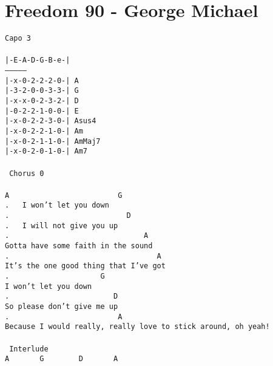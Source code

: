 \newpage
\section{Freedom 90 - George Michael}
\label{Freedom 90 - George Michael}
\texttt{Capo 3\\
\\
|-E-A-D-G-B-e-|\\
---------------\\
|-x-0-2-2-2-0-|\ A\\
|-3-2-0-0-3-3-|\ G\\
|-x-x-0-2-3-2-|\ D\\
|-0-2-2-1-0-0-|\ E\\
|-x-0-2-2-3-0-|\ Asus4\\
|-x-0-2-2-1-0-|\ Am\\
|-x-0-2-1-1-0-|\ AmMaj7\\
|-x-0-2-0-1-0-|\ Am7\\
\\
\lbrack\ Chorus\ 0\rbrack\\
\\
A\ \ \ \ \ \ \ \ \ \ \ \ \ \ \ \ \ \ \ \ \ \ \ \ \ G\\
. \ \ I\ won't\ let\ you\ down\\
. \ \ \ \ \ \ \ \ \ \ \ \ \ \ \ \ \ \ \ \ \ \ \ \ \ \ D\\
. \ \ I\ will\ not\ give\ you\ up\\
. \ \ \ \ \ \ \ \ \ \ \ \ \ \ \ \ \ \ \ \ \ \ \ \ \ \ \ \ \ \ A\\
Gotta\ have\ some\ faith\ in\ the\ sound\\
. \ \ \ \ \ \ \ \ \ \ \ \ \ \ \ \ \ \ \ \ \ \ \ \ \ \ \ \ \ \ \ \ \ A\ \ \\
It's\ the\ one\ good\ thing\ that\ I've\ got\\
. \ \ \ \ \ \ \ \ \ \ \ \ \ \ \ \ \ \ \ \ G\ \\
I\ won't\ let\ you\ down\\
. \ \ \ \ \ \ \ \ \ \ \ \ \ \ \ \ \ \ \ \ \ \ \ D\\
So\ please\ don't\ give\ me\ up\\
. \ \ \ \ \ \ \ \ \ \ \ \ \ \ \ \ \ \ \ \ \ \ \ \ A\ \ \ \ \ \ \ \ \ \ \ \ \ \ \ \ \ \ \ \ \ \ \ \ \ \ \ \ \ \\
Because\ I\ would\ really,\ really\ love\ to\ stick\ around,\ oh\ yeah!\\
\\
\lbrack\ Interlude\rbrack\\
A\ \ \ \ \ \ \ G\ \ \ \ \ \ \ \ D\ \ \ \ \ \ \ A\ \ \ \\
}
